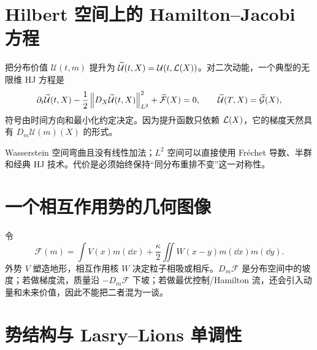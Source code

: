 \section{Hilbert 空间上的 Hamilton--Jacobi 方程}

把分布价值 $\mathcal U(t,m)$ 提升为 $\widetilde{\mathcal U}(t,X)=\mathcal U(t,\mathcal{L}(X))$。对二次动能，一个典型的无限维 HJ 方程是
\[
\partial_t\widetilde{\mathcal U}(t,X)
-\frac12\left\lVert D_X\widetilde{\mathcal U}(t,X)\right\rVert_{L^2}^2
+\widetilde{\mathcal F}(X)=0,
\qquad
\widetilde{\mathcal U}(T,X)=\widetilde{\mathcal G}(X),
\]
符号由时间方向和最小化约定决定。因为提升函数只依赖 $\mathcal{L}(X)$，它的梯度天然具有 $D_m\mathcal U(m)(X)$ 的形式。

\begin{intuition}
Wasserstein 空间弯曲且没有线性加法；$L^2$ 空间可以直接使用 Fréchet 导数、半群和经典 HJ 技术。代价是必须始终保持“同分布重排不变”这一对称性。
\end{intuition}

\section{一个相互作用势的几何图像}

令
\[
\mathcal F(m)=\int V(x)m(\dd x)+\frac\kappa2\iint W(x-y)m(\dd x)m(\dd y).
\]
外势 $V$ 塑造地形，相互作用核 $W$ 决定粒子相吸或相斥。$D_m\mathcal F$ 是分布空间中的坡度；若做梯度流，质量沿 $-D_m\mathcal F$ 下坡；若做最优控制/Hamilton 流，还会引入动量和未来价值，因此不能把二者混为一谈。

\begin{center}
\end{center}

\section{势结构与 Lasry--Lions 单调性}

